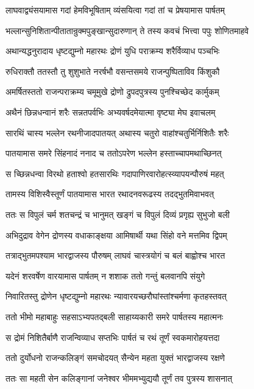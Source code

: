\twolineshloka
{लाघवाद्व्यंसयामास गदां हेमविभूषिताम्}
{व्यंसयित्वा गदां तां च प्रेषयामास पार्षतम्}


\twolineshloka
{भल्लान्सुनिशितान्पीतातान्रुक्मपुङ्खान्सुदारुणान्}
{ते तस्य कवचं भित्त्वा पपुः शोणितमाहवे}


\twolineshloka
{अथान्यद्धनुरादाय धृष्टद्युम्नो महारथः}
{द्रोणं युधि पराक्रम्य शरैर्विव्याध पञ्चभिः}


\twolineshloka
{रुधिराक्तौ ततस्तौ तु शुशुभाते नरर्षभौ}
{वसन्तसमये राजन्पुष्पिताविव किंशुकौ}


\twolineshloka
{अमर्षितस्ततो राजन्पराक्रम्य चमूमुखे}
{द्रोणो द्रुपदपुत्रस्य पुनश्चिच्छेद कार्मुकम्}


\twolineshloka
{अथैनं छिन्नधन्वानं शरैः सन्नतपर्वभिः}
{अभ्यवर्षदमेयात्मा वृष्ट्या मेघ इवाचलम्}


\twolineshloka
{सारथिं चास्य भल्लेन रथनीजादपातयत्}
{अथास्य चतुरो वाहांश्चतुर्भिर्निशितैः शरैः}


\twolineshloka
{पातयामास समरे सिंहनादं ननाद च}
{ततोऽपरेण भल्लेन हस्ताच्चापमथाच्छिनत्}


\twolineshloka
{स च्छिन्नधन्वा विरथो हताश्वो हतसारथिः}
{गदापाणिरवारोहत्स्व्यापयन्पौरुषं महत्}


\twolineshloka
{तामस्य विशिस्वैस्तूर्णं पातयामास भारत}
{रथादनवरूढस्य तदद्भुतमिवाभवत्}


\twolineshloka
{ततः स विपुलं चर्म शतचन्द्रं च भानुमत्}
{खङ्गं च विपुलं दिव्यं प्रगृह्य सुभुजो बली}


\twolineshloka
{अभिदुद्राव वेगेन द्रोणस्य वधाकाङ्क्षया}
{आमिषार्थी यथा सिंहो वने मत्तमिव द्विपम्}


\twolineshloka
{तत्राद्भुतमपश्याम भारद्वाजस्य पौरुषम्}
{लाघवं चास्त्रयोगं च बलं बाह्वोश्च भारत}


\twolineshloka
{यदेनं शरवर्षेण वारयामास पार्षतम्}
{न शशाक ततो गन्तुं बलवानपि संयुगे}


\twolineshloka
{निवारितस्तु द्रोणेन धृष्टद्युम्नो महारथः}
{न्यावारयच्छरौघांस्तांश्चर्मणा कृतहस्तवत्}


\twolineshloka
{ततो भीमो महाबाहुः सहसाऽभ्यपतद्बली}
{साहाय्यकारी समरे पार्षतस्य महात्मनः}


\twolineshloka
{स द्रोमं निशितैर्बाणै राजन्विव्याध सप्तभिः}
{पार्षतं च रथं तूर्णं स्वकमारोहयत्तदा}


\twolineshloka
{ततो दुर्योधनो राजन्कलिङ्गं समचोदयत्}
{सैन्येन महता युक्तं भारद्वाजस्य रक्षणे}


\twolineshloka
{ततः सा महती सेन कलिङ्गानां जनेश्वर}
{भीममभ्युद्ययौ तूर्णं तव पुत्रस्य शासनात्}


